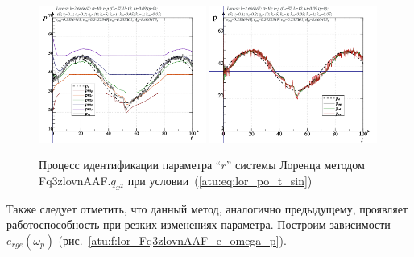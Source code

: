 \begin{figure}[ht!]
  \centerline{
    \includegraphics[width=0.49\textwidth]{p/cha/lor/Fq3zlovnAAF/lor_Fq3zlovnAAF_qx2-pl_n_sin.png}
    \hfill
    \includegraphics[width=0.49\textwidth]{p/cha/lor/Fq3zlovnAAF/lor_Fq3zlovnAAF_qx2-p_p_sin.png}
  }
  \caption{Процесс идентификации параметра ``$r$'' системы Лоренца методом Fq3zlovnAAF.$q_{x^2}$ при условии~(\ref{atu:eq:lor_po_t_sin})}
  \label{atu:f:lor_id_Fq3zlovnAAF.q_x2_sin}
\end{figure}

Также следует отметить, что данный метод, аналогично предыдущему,
проявляет работоспособность при резких изменениях параметра.
Построим зависимости
$\overline{e}_{rge}(\omega_p)$ (рис.~\ref{atu:f:lor_Fq3zlovnAAF_e_omega_p}).


